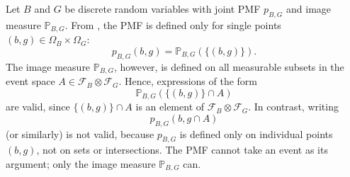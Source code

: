 \begin{remark}
	\label{remark:pmf_vs_measure}
	Let $B$ and $G$ be discrete random variables with joint PMF $p_{B,G}$ and image measure $\mathbb{P}_{B,G}$. From , the PMF is defined only for single points $(b,g) \in \Omega_B \times \Omega_G$:
	\begin{equation}
		p_{B,G}(b,g) = \mathbb{P}_{B,G}(\{(b,g)\}).
	\end{equation}
	The image measure $\mathbb{P}_{B,G}$, however, is defined on all measurable subsets in the event space $A \in \mathcal{F}_B\otimes\mathcal{F}_G$. Hence, expressions of the form
	\begin{equation}
		\mathbb{P}_{B,G}(\{(b,g)\} \cap A)
	\end{equation}
	are valid, since $\{(b,g)\} \cap A$ is an element of $\mathcal{F}_B\otimes\mathcal{F}_G$. In contrast, writing
	\begin{equation}
		p_{B,G}(b,g \cap A)
	\end{equation}
	(or similarly) is not valid, because $p_{B,G}$ is defined only on individual points $(b,g)$, not on sets or intersections. The PMF cannot take an event as its argument; only the image measure $\mathbb{P}_{B,G}$ can.
\end{remark}




